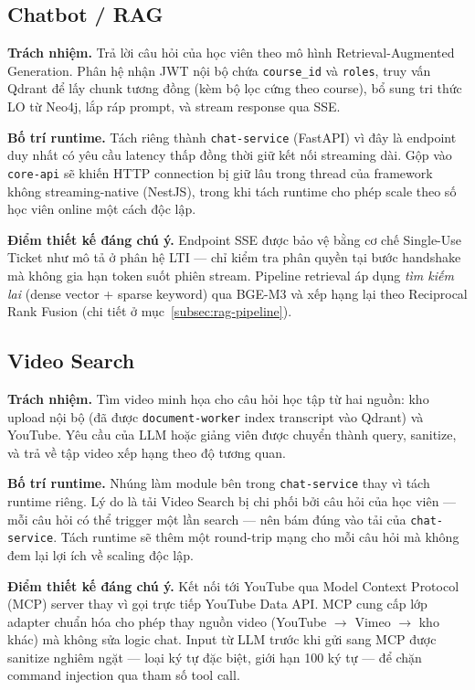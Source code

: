 \subsection{Chatbot / RAG}

\textbf{Trách nhiệm.} Trả lời câu hỏi của học viên theo mô hình
Retrieval-Augmented Generation. Phân hệ nhận JWT nội bộ chứa
\texttt{course\_id} và \texttt{roles}, truy vấn Qdrant để lấy chunk tương
đồng (kèm bộ lọc cứng theo course), bổ sung tri thức LO từ Neo4j, lắp
ráp prompt, và stream response qua SSE.

\textbf{Bố trí runtime.} Tách riêng thành \texttt{chat-service} (FastAPI)
vì đây là endpoint duy nhất có yêu cầu latency thấp đồng thời giữ kết nối
streaming dài. Gộp vào \texttt{core-api} sẽ khiến HTTP connection bị giữ
lâu trong thread của framework không streaming-native (NestJS), trong khi
tách runtime cho phép scale theo số học viên online một cách độc lập.

\textbf{Điểm thiết kế đáng chú ý.} Endpoint SSE được bảo vệ bằng cơ chế
Single-Use Ticket như mô tả ở phân hệ LTI --- chỉ kiểm tra phân quyền tại
bước handshake mà không gia hạn token suốt phiên stream. Pipeline retrieval
áp dụng \emph{tìm kiếm lai} (dense vector + sparse keyword) qua BGE-M3 và
xếp hạng lại theo Reciprocal Rank Fusion (chi tiết ở
mục~\ref{subsec:rag-pipeline}).

\subsection{Video Search}
\label{subsec:video-search-service}

\textbf{Trách nhiệm.} Tìm video minh họa cho câu hỏi học tập từ hai
nguồn: kho upload nội bộ (đã được \texttt{document-worker} index
transcript vào Qdrant) và YouTube. Yêu cầu của LLM hoặc giảng viên được
chuyển thành query, sanitize, và trả về tập video xếp hạng theo độ tương
quan.

\textbf{Bố trí runtime.} Nhúng làm module bên trong \texttt{chat-service}
thay vì tách runtime riêng. Lý do là tải Video Search bị chi phối bởi câu
hỏi của học viên --- mỗi câu hỏi có thể trigger một lần search --- nên
bám đúng vào tải của \texttt{chat-service}. Tách runtime sẽ thêm một
round-trip mạng cho mỗi câu hỏi mà không đem lại lợi ích về scaling độc
lập.

\textbf{Điểm thiết kế đáng chú ý.} Kết nối tới YouTube qua Model Context
Protocol (MCP) server thay vì gọi trực tiếp YouTube Data API. MCP cung
cấp lớp adapter chuẩn hóa cho phép thay nguồn video (YouTube $\to$ Vimeo
$\to$ kho khác) mà không sửa logic chat. Input từ LLM trước khi gửi sang
MCP được sanitize nghiêm ngặt --- loại ký tự đặc biệt, giới hạn 100 ký
tự --- để chặn command injection qua tham số tool call.

